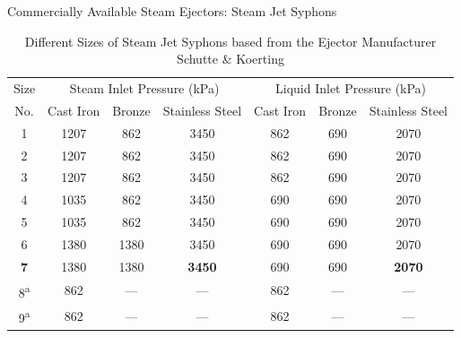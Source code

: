\begin{frame}{Commercially Available Steam Ejectors: Steam Jet Syphons\cite{SchutteandKoerting}}
    \begin{table}[h]
    \centering
    \caption{\centering \scriptsize Different Sizes of Steam Jet Syphons based from the Ejector Manufacturer Schutte \& Koerting\cite{SchutteandKoerting}}
    \label{tab:SteamJetSyphons_workingpress}
    \begin{tabular}{|c|c|c|c|c|c|c|}
    \hline
        Size & \multicolumn{3}{c|}{Steam Inlet Pressure (kPa)} & \multicolumn{3}{c|}{Liquid Inlet Pressure (kPa)}\\
    \cline{2-7}
        No. & Cast Iron & Bronze & Stainless Steel & Cast Iron & Bronze & Stainless Steel \\
    \hline
        1 & 1207 & 862 & 3450 & 862 & 690 & 2070 \\
    \hline
        2 & 1207 & 862 & 3450 & 862 & 690 & 2070 \\
    \hline
        3 & 1207 & 862 & 3450 & 862 & 690 & 2070 \\
    \hline
        4 & 1035 & 862 & 3450 & 690 & 690 & 2070 \\
    \hline
        5 & 1035 & 862 & 3450 & 690 & 690 & 2070 \\
    \hline
        6 & 1380 & 1380 & 3450 & 690 & 690 & 2070 \\
    \hline
        \textbf{7} & 1380 & 1380 & \textbf{3450} & 690 & 690 & \textbf{2070} \\
    \hline
        8\textsuperscript{a} & 862 & --- & --- & 862 & --- & --- \\
    \hline
        9\textsuperscript{a} & 862 & --- & --- & 862 & --- & --- \\
    \hline
    \end{tabular}
\end{table}
\end{frame}

